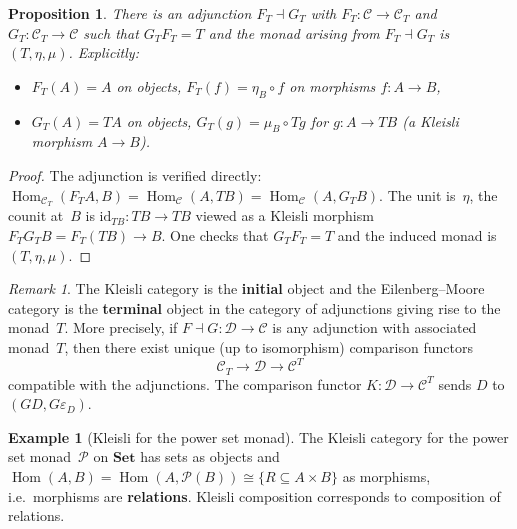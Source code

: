 \documentclass[a4paper,12pt]{book}
\DeclareMathOperator{\Hom}{Hom}
\newcommand{\Set}{\mathbf{Set}}
\newcommand{\id}{\mathrm{id}}
\theoremstyle{definition}
\newtheorem{example}[definition]{Example}
\theoremstyle{plain}
\newtheorem{proposition}[definition]{Proposition}
\theoremstyle{remark}
\newtheorem{remark}[definition]{Remark}
\begin{document}
\begin{proposition}\label{prop:kleisli-adjunction}
There is an adjunction $F_T\dashv G_T$ with
$F_T\colon\mathcal{C}\to\mathcal{C}_T$ and
$G_T\colon\mathcal{C}_T\to\mathcal{C}$ such that $G_TF_T = T$
and the monad arising from $F_T\dashv G_T$ is~$(T,\eta,\mu)$.
Explicitly:
\begin{itemize}
\item $F_T(A) = A$ on objects, $F_T(f) = \eta_B\circ f$ on morphisms
    $f\colon A\to B$,
\item $G_T(A) = TA$ on objects, $G_T(g) = \mu_B\circ Tg$ for
    $g\colon A\to TB$ (a Kleisli morphism $A\to B$).
\end{itemize}
\end{proposition}

\begin{proof}
The adjunction is verified directly:
$\Hom_{\mathcal{C}_T}(F_TA,B) = \Hom_{\mathcal{C}}(A,TB) = \Hom_{\mathcal{C}}(A,G_TB)$.
The unit is~$\eta$, the counit at~$B$ is $\id_{TB}\colon TB\to TB$
viewed as a Kleisli morphism $F_TG_TB = F_T(TB)\to B$.
One checks that $G_TF_T = T$ and the induced monad is $(T,\eta,\mu)$.
\end{proof}

\begin{remark}\label{rem:kleisli-em-universal}
The Kleisli category is the \textbf{initial} object and the
Eilenberg--Moore category is the \textbf{terminal} object in the
category of adjunctions giving rise to the monad~$T$.
More precisely, if $F\dashv G\colon\mathcal{D}\to\mathcal{C}$ is
any adjunction with associated monad~$T$, then there exist unique
(up to isomorphism) comparison functors
\[
    \mathcal{C}_T \longrightarrow \mathcal{D}
    \longrightarrow \mathcal{C}^T
\]
compatible with the adjunctions.  The comparison functor
$K\colon\mathcal{D}\to\mathcal{C}^T$ sends $D$ to $(GD,G\varepsilon_D)$.
\end{remark}

\begin{example}[Kleisli for the power set monad]\label{ex:kleisli-powerset}
The Kleisli category for the power set monad~$\mathcal{P}$ on $\Set$
has sets as objects and $\Hom(A,B) = \Hom(A,\mathcal{P}(B)) \cong
\{R\subseteq A\times B\}$ as morphisms, i.e.\ morphisms are
\textbf{relations}.  Kleisli composition corresponds to composition
of relations.
\end{example}
\end{document}
